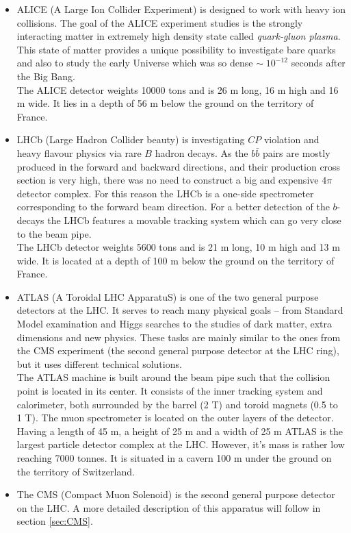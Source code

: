 \begin{itemize}
 \item ALICE (A Large Ion Collider Experiment)\cite{ALICEtdr} is designed to
 work with heavy ion collisions. The goal of the ALICE experiment studies is
 the strongly interacting matter in extremely high density state called \textit{quark-gluon plasma}. This 
 state of matter provides a unique possibility to investigate bare quarks and also to study the early
 Universe which was so dense $\sim\;10^{-12}$ seconds after the Big Bang.
 \\
 The ALICE detector weights 10000 tons and is 26 m long, 16 m high and 16 m wide. It lies in a depth of
 56 m below the ground on the territory of France.
 
 \item LHCb (Large Hadron Collider beauty)\cite{LHCb} is investigating $CP$ violation and heavy flavour physics via
 rare $B$ hadron decays. As the $b\bar{b}$ pairs are mostly produced in the forward and backward directions, 
 and their production cross section is very high, there was no need to construct a big and expensive $4\pi$ detector 
 complex. For this reason the LHCb is a one-side spectrometer corresponding to the forward beam direction.
 For a better detection of the $b$-decays the LHCb features a movable tracking system which can go very close
 to the beam pipe.
 \\
 The LHCb detector weights 5600 tons and is 21 m long, 10 m high and 13 m wide. It is located at a depth of 100 m 
 below the ground on the territory of France.
 
 \item ATLAS (A Toroidal LHC ApparatuS)\cite{ATLAS} is one of the two general purpose detectors at the LHC. It serves to reach many physical
 goals -- from Standard Model examination and Higgs searches to the studies of dark matter, extra dimensions and new physics.
 These tasks are mainly similar to the ones from the CMS experiment (the second general purpose detector at the LHC ring), but
 it uses different technical solutions.
 \\
 The ATLAS machine is built around the beam pipe such that the collision point is located in its center. It consists of the 
 inner tracking system and calorimeter, both surrounded by the barrel (2 T) and toroid magnets (0.5 to 1 T). The muon spectrometer
 is located on the outer layers of the detector.
 \\
 Having a length of 45 m, a height of 25 m and a width of 25 m ATLAS is the largest particle detector complex at the LHC. However, it's mass 
 is rather low reaching 7000 tonnes. It is situated in a cavern 100 m under the ground on the territory of Switzerland.
 
 \item The CMS (Compact Muon Solenoid) is the second general purpose detector on the LHC. A more detailed description of this apparatus will follow in
 section \ref{sec:CMS}.
 
\end{itemize}


